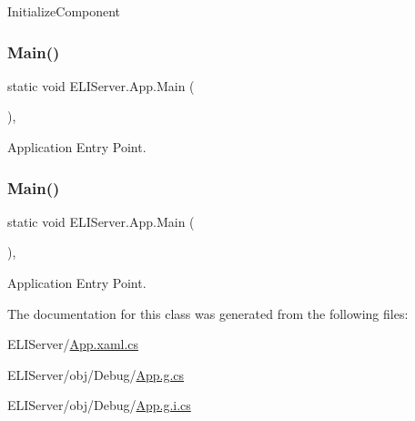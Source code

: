 Initialize\+Component 

\mbox{\label{class_e_l_i_server_1_1_app_ab09015a9976089763eee4216f788d38e}} 
\subsubsection{\texorpdfstring{Main()}{Main()}\hspace{0.1cm}{\footnotesize\ttfamily [1/2]}}
{\footnotesize\ttfamily static void E\+L\+I\+Server.\+App.\+Main (\begin{DoxyParamCaption}{ }\end{DoxyParamCaption})\hspace{0.3cm}{\ttfamily [inline]}, {\ttfamily [static]}}



Application Entry Point. 

\mbox{\label{class_e_l_i_server_1_1_app_ab09015a9976089763eee4216f788d38e}} 
\subsubsection{\texorpdfstring{Main()}{Main()}\hspace{0.1cm}{\footnotesize\ttfamily [2/2]}}
{\footnotesize\ttfamily static void E\+L\+I\+Server.\+App.\+Main (\begin{DoxyParamCaption}{ }\end{DoxyParamCaption})\hspace{0.3cm}{\ttfamily [inline]}, {\ttfamily [static]}}



Application Entry Point. 



The documentation for this class was generated from the following files\+:\begin{DoxyCompactItemize}
\item 
E\+L\+I\+Server/\hyperlink{_e_l_i_server_2_e_l_i_server_2_app_8xaml_8cs}{App.\+xaml.\+cs}\item 
E\+L\+I\+Server/obj/\+Debug/\hyperlink{_e_l_i_server_2_e_l_i_server_2obj_2_debug_2_app_8g_8cs}{App.\+g.\+cs}\item 
E\+L\+I\+Server/obj/\+Debug/\hyperlink{_e_l_i_server_2_e_l_i_server_2obj_2_debug_2_app_8g_8i_8cs}{App.\+g.\+i.\+cs}\end{DoxyCompactItemize}
